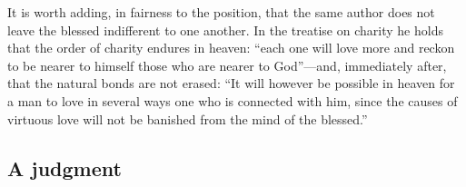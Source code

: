 It is worth adding, in fairness to the position, that the same author does not leave the blessed indifferent to one another. In the treatise on charity he holds that the order of charity endures in heaven: ``each one will love more and reckon to be nearer to himself those who are nearer to God''---and, immediately after, that the natural bonds are not erased: ``It will however be possible in heaven for a man to love in several ways one who is connected with him, since the causes of virtuous love will not be banished from the mind of the blessed.''

\subsection{A judgment}

